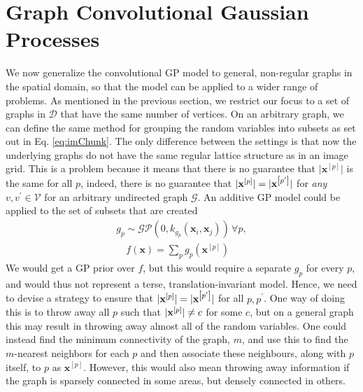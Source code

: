 \documentclass{article}
\DeclarePairedDelimiter\abs{\lvert}{\rvert}\DeclarePairedDelimiter\norm{\lVert}{\rVert}\newcommand{\p}[1]{\left(#1\right)}
\newcommand{\qb}[1]{ \left[#1 \right]}
\begin{document}
\section{Graph Convolutional Gaussian Processes}

We now generalize the convolutional GP model to general, non-regular graphs in the spatial domain, so that the model can be applied to a wider range of problems. As mentioned in the previous section, we restrict our focus to a set of graphs in $\mathcal{D}$ that have the same number of vertices. On an arbitrary graph, we can define the same method for grouping the random variables into subsets as set out in Eq. \eqref{eq:imChunk}. The only difference between the settings is that now the underlying graphs do not have the same regular lattice structure as in an image grid. This is a problem because it means that there is no guarantee that $\lvert \mathbf{x}^{\qb{p}}\rvert$ is the same for all $p$, indeed, there is no guarantee that $\abs{\mathbf{x}^{\qb{p}}} = \abs{\mathbf{x}^{\qb{p^\prime}}}$ for \textit{any} $v, v^\prime  \in \mathcal{V}$ for an arbitrary undirected graph $\mathcal{G}$.
An additive GP model could be applied to the set of subsets that are created
\begin{equation}
\begin{split}
g_p \sim \mathcal{GP}\p{0, k_{g_p}\p{\bm{x}_i, \bm{x}_j}} \, \forall p,\\
\quad f(\mathbf{x}) = \sum_p g_p\p{\mathbf{x}^{\qb{p}}}
\end{split}
\end{equation}
We would get a GP prior over $f$, but this would require a separate $g_p$ for every $p$, and would thus not represent a terse, translation-invariant model. Hence, we need to devise a strategy to ensure that $\abs{\mathbf{x}^{\qb{p}}} = \abs{\mathbf{x}^{\qb{p^\prime}}}$ for all $p, p^\prime$. One way of doing this is to throw away all $p$ such that $\abs{\mathbf{x}^{\qb{p}}} \neq c$ for some $c$, but on a general graph this may result in throwing away almost all of the random variables. One could instead find the minimum connectivity of the graph, $m$, and use this to find the $m$-nearest neighbors for each $p$ and then associate these neighbours, along with $p$ itself, to $p$ as $\mathbf{x}^{\qb{p}}$. However, this would also mean throwing away information if the graph is sparsely connected in some areas, but densely connected in others.
\end{document}
